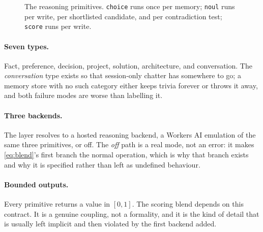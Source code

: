 \documentclass[10pt,twocolumn]{article}
\begin{document}
\begin{figure}[t]
\centering
{}
\caption{The reasoning primitives. \texttt{choice} runs once per memory;
\texttt{noul} runs per write, per shortlisted candidate, and per contradiction
test; \texttt{score} runs per write.}
\label{fig:jev}
\end{figure}

\paragraph{Seven types.}
Fact, preference, decision, project, solution, architecture, and conversation.
The \emph{conversation} type exists so that session-only chatter has somewhere
to go; a memory store with no such category either keeps trivia forever or
throws it away, and both failure modes are worse than labelling it.

\paragraph{Three backends.}
The layer resolves to a hosted reasoning backend, a Workers AI emulation of the
same three primitives, or off. The \emph{off} path is a real mode, not an
error: it makes \cref{eq:blend}'s first branch the normal operation, which is
why that branch exists and why it is specified rather than left as undefined
behaviour.

\paragraph{Bounded outputs.}
Every primitive returns a value in $[0,1]$. The scoring blend depends on this
contract. It is a genuine coupling, not a formality, and it is the kind of
detail that is usually left implicit and then violated by the first backend
added.
\end{document}

